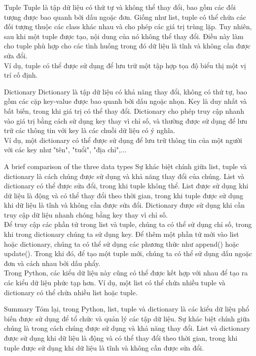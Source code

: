 \documentclass[12pt]{amsart}
\begin{document}
\begin{section}{Tuple}
    Tuple là tập dữ liệu có thứ tự và không thể thay đổi, bao gồm các đối tượng được bao quanh bởi dấu ngoặc đơn. Giống như list, tuple có thể chứa các đối tượng thuộc các class khác nhau và cho phép các giá trị trùng lặp. Tuy nhiên, sau khi một tuple được tạo, nội dung của nó không thể thay đổi. Điều này làm cho tuple phù hợp cho các tình huống trong đó dữ liệu là tĩnh và không cần được sửa đổi.  \\

    Ví dụ, tuple có thể được sử dụng để lưu trữ một tập hợp tọa độ biểu thị một vị trí cố định.

\end{section}
\begin{section}{Dictionary}
    Dictionary là tập dữ liệu có khả năng thay đổi, không có thứ tự, bao gồm các cặp key-value được bao quanh bởi dấu ngoặc nhọn. Key là duy nhất và bất biến, trong khi giá trị có thể thay đổi. Dictionary cho phép truy cập nhanh vào giá trị bằng cách sử dụng key thay vì chỉ số, và thường được sử dụng để lưu trữ các thông tin với key là các chuỗi dữ liệu có ý nghĩa. \\

    Ví dụ, một dictionary có thể được sử dụng để lưu trữ thông tin của một người với các key như "tên", "tuổi", "địa chỉ",...
\end{section}
\begin{section}{A brief comparison of the three data types}
    Sự khác biệt chính giữa list, tuple và dictionary là cách chúng được sử dụng và khả năng thay đổi của chúng. List và dictionary có thể được sửa đổi, trong khi tuple không thể. List được sử dụng khi dữ liệu là động và có thể thay đổi theo thời gian, trong khi tuple được sử dụng khi dữ liệu là tĩnh và không cần được sửa đổi. Dictionary được sử dụng khi cần truy cập dữ liệu nhanh chóng bằng key thay vì chỉ số. \\

    Để truy cập các phần tử trong list và tuple, chúng ta có thể sử dụng chỉ số, trong khi trong dictionary chúng ta sử dụng key. Để thêm một phần tử mới vào list hoặc dictionary, chúng ta có thể sử dụng các phương thức như append() hoặc update(). Trong khi đó, để tạo một tuple mới, chúng ta có thể sử dụng dấu ngoặc đơn và cách nhau bởi dấu phẩy. \\

    Trong Python, các kiểu dữ liệu này cũng có thể được kết hợp với nhau để tạo ra các kiểu dữ liệu phức tạp hơn. Ví dụ, một list có thể chứa nhiều tuple và dictionary có thể chứa nhiều list hoặc tuple.

\end{section}
\begin{section}{Summary}
    Tóm lại, trong Python, list, tuple và dictionary là các kiểu dữ liệu phổ biến được sử dụng để tổ chức và quản lý các tập dữ liệu. Sự khác biệt chính giữa chúng là trong cách chúng được sử dụng và khả năng thay đổi. List và dictionary được sử dụng khi dữ liệu là động và có thể thay đổi theo thời gian, trong khi tuple được sử dụng khi dữ liệu là tĩnh và không cần được sửa đổi.
\end{section}
\end{document}

